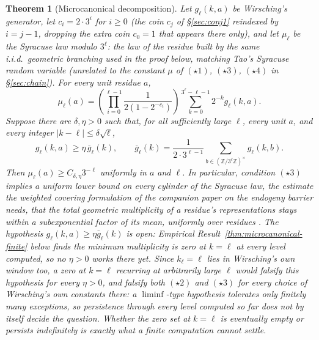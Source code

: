 \documentclass[11pt]{article}
\newtheorem{theorem}{Theorem}[section]
\theoremstyle{remark}
\begin{document}
\begin{theorem}[Microcanonical decomposition]\label{thm:microcanonical}
Let $g_\ell(k,a)$ be Wirsching's generator, let
$c_i=2\cdot3^i$ for $i\ge0$ (the coin $c_j$ of \S\ref{sec:conj1}
reindexed by $i=j-1$, dropping the extra coin $c_0=1$ that appears
there only), and let $\mu_\ell$ be the Syracuse law modulo
$3^\ell$: the law of the residue built by the same i.i.d.\ geometric
branching used in the proof below, matching Tao's Syracuse random
variable \cite{Tao2020}
(unrelated to the constant $\mu$ of $(\star1)$, $(\star3)$,
$(\star4)$ in \S\ref{sec:chain}). For every unit residue $a$,
\begin{equation}\label{eq:microcanonical}
 \mu_\ell(a)=
 \left(\prod_{i=0}^{\ell-1}\frac{1}{2(1-2^{-c_i})}\right)
 \sum_{k=0}^{3^\ell-\ell-1}2^{-k}g_\ell(k,a).
\end{equation}
Suppose there are $\delta,\eta>0$ such that, for all sufficiently large
$\ell$, every unit $a$, and every integer
$|k-\ell|\le\delta\sqrt\ell$,
\[
 g_\ell(k,a)\ge\eta\,\overline g_\ell(k),
 \qquad
 \overline g_\ell(k)=\frac{1}{2\cdot3^{\ell-1}}
 \sum_{b\in(\mathbb Z/3^\ell\mathbb Z)^\times}g_\ell(k,b).
\]
Then $\mu_\ell(a)\ge C_{\delta,\eta}3^{-\ell}$ uniformly in $a$ and
$\ell$. In particular, condition $(\star3)$ implies a uniform lower bound
on every cylinder of the Syracuse law, the estimate the weighted
covering formulation of the companion paper on the endogeny barrier
needs, that the total geometric multiplicity of a residue's
representations stays within a subexponential factor of its mean,
uniformly over residues \cite{BarrierCompanion}. The hypothesis $g_\ell(k,a)\ge\eta\bar
g_\ell(k)$ is open: Empirical Result~\ref{thm:microcanonical-finite}
below finds the minimum multiplicity is zero at $k=\ell$ at every
level computed, so no $\eta>0$ works there yet. Since $k_\ell=\ell$ lies
in Wirsching's own window too, a zero at $k=\ell$ recurring at
arbitrarily large $\ell$ would falsify this hypothesis for every
$\eta>0$, and falsify both $(\star2)$ and $(\star3)$ for every choice
of Wirsching's own constants there: a $\liminf$-type
hypothesis tolerates only finitely many exceptions, so persistence
through every level computed so far does not by itself decide the
question. Whether the zero set at $k=\ell$ is eventually empty or
persists indefinitely is exactly what a finite computation cannot
settle.
\end{theorem}
\end{document}
